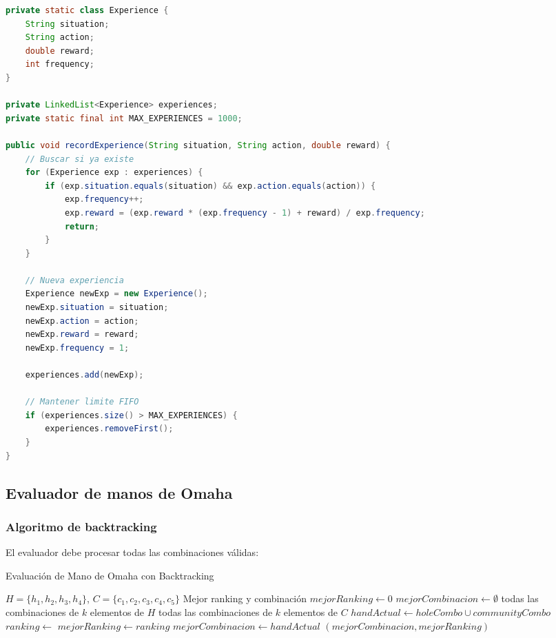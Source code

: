 \documentclass[12pt,a4paper]{article}
\begin{document}
\begin{lstlisting}[language=Java, caption=Cola FIFO de experiencias]
private static class Experience {
    String situation;
    String action;
    double reward;
    int frequency;
}

private LinkedList<Experience> experiences;
private static final int MAX_EXPERIENCES = 1000;

public void recordExperience(String situation, String action, double reward) {
    // Buscar si ya existe
    for (Experience exp : experiences) {
        if (exp.situation.equals(situation) && exp.action.equals(action)) {
            exp.frequency++;
            exp.reward = (exp.reward * (exp.frequency - 1) + reward) / exp.frequency;
            return;
        }
    }
    
    // Nueva experiencia
    Experience newExp = new Experience();
    newExp.situation = situation;
    newExp.action = action;
    newExp.reward = reward;
    newExp.frequency = 1;
    
    experiences.add(newExp);
    
    // Mantener limite FIFO
    if (experiences.size() > MAX_EXPERIENCES) {
        experiences.removeFirst();
    }
}
\end{lstlisting}

\subsection{Evaluador de manos de Omaha}

\subsubsection{Algoritmo de backtracking}

El evaluador debe procesar todas las combinaciones válidas:

\begin{algorithm}[H]
\caption{Evaluación de Mano de Omaha con Backtracking}
\begin{algorithmic}[1]
\Require $H = \{h_1, h_2, h_3, h_4\}$, $C = \{c_1, c_2, c_3, c_4, c_5\}$
\Ensure Mejor ranking y combinación
\State $mejorRanking \gets 0$
\State $mejorCombinacion \gets \emptyset$
\State
{}
    \State \Return todas las combinaciones de $k$ elementos de $H$
\EndFunction
\State
{}
    \State \Return todas las combinaciones de $k$ elementos de $C$
\EndFunction
\State
{}
        \State $handActual \gets holeCombo \cup communityCombo$
        \State $ranking \gets$ 
            \State $mejorRanking \gets ranking$
            \State $mejorCombinacion \gets handActual$
        \EndIf
    \EndFor
\EndFor
\State
\State \Return $(mejorCombinacion, mejorRanking)$
\end{algorithmic}
\end{algorithm}
\end{document}
